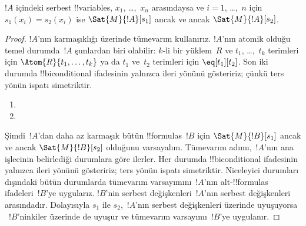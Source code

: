 \begin{prop}
$!A$ içindeki serbest !!{variable}s, $x_1$, \dots,~$x_n$ arasındaysa
ve $i = 1$, \dots,~$n$ için $s_1(x_i) = s_2(x_i)$ ise
$\Sat{M}{!A}[s_1]$ ancak ve ancak $\Sat{M}{!A}[s_2]$.
\end{prop}

\begin{proof}
$!A$'nın karmaşıklığı üzerinde tümevarım kullanırız. $!A$'nın atomik
olduğu temel durumda~$!A$ şunlardan biri olabilir:
$k$-li bir yüklem~$R$ ve $t_1$, \dots,~$t_k$ terimleri için
$\Atom{R}{t_1, \dots, t_k}$ ya da $t_1$ ve~$t_2$ terimleri için
$\eq[t_1][t_2]$. Son iki durumda !!{biconditional} ifadesinin yalnızca
ileri yönünü gösteririz; çünkü ters yönün ispatı simetriktir.

\begin{enumerate}


\item
\item
\end{enumerate}

Şimdi~$!A$'dan daha az karmaşık bütün !!{formula}s~$!B$ için
$\Sat{M}{!B}[s_1]$ ancak ve ancak $\Sat{M}{!B}[s_2]$ olduğunu
varsayalım. Tümevarım adımı,~$!A$'nın ana işlecinin belirlediği
durumlara göre ilerler. Her durumda !!{biconditional} ifadesinin yalnızca
ileri yönünü gösteririz; ters yönün ispatı simetriktir. Niceleyici
durumları dışındaki bütün durumlarda tümevarım varsayımını~$!A$'nın
alt-!!{formula}s ifadeleri~$!B$'ye uygularız. $!B$'nin serbest
değişkenleri~$!A$'nın serbest değişkenleri arasındadır. Dolayısıyla
$s_1$ ile $s_2$,~$!A$'nın serbest değişkenleri üzerinde uyuşuyorsa
~$!B$'ninkiler üzerinde de uyuşur ve tümevarım varsayımı~$!B$'ye
uygulanır.


\end{proof}
